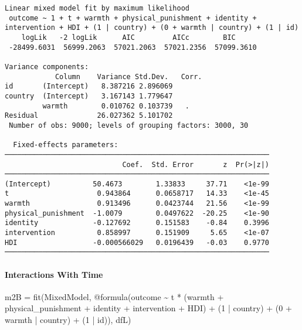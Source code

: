 \documentclass[
  letterpaper,
  DIV=11,
  numbers=noendperiod]{scrreprt}
\let\oldparagraph\paragraph
\renewcommand{\paragraph}[1]{\oldparagraph{#1}\mbox{}}
\newenvironment{Shaded}{\begin{snugshade}}{\end{snugshade}}
\newcommand{\FloatTok}[1]{\textcolor[rgb]{0.68,0.00,0.00}{#1}}
\newcommand{\FunctionTok}[1]{\textcolor[rgb]{0.28,0.35,0.67}{#1}}
\newcommand{\NormalTok}[1]{\textcolor[rgb]{0.00,0.23,0.31}{#1}}
\newcommand{\OperatorTok}[1]{\textcolor[rgb]{0.37,0.37,0.37}{#1}}
\newcommand{\PreprocessorTok}[1]{\textcolor[rgb]{0.68,0.00,0.00}{#1}}
\begin{document}
\begin{verbatim}
Linear mixed model fit by maximum likelihood
 outcome ~ 1 + t + warmth + physical_punishment + identity + intervention + HDI + (1 | country) + (0 + warmth | country) + (1 | id)
    logLik   -2 logLik      AIC         AICc        BIC     
 -28499.6031  56999.2063  57021.2063  57021.2356  57099.3610

Variance components:
            Column    Variance Std.Dev.   Corr.
id       (Intercept)   8.387216 2.896069
country  (Intercept)   3.167143 1.779647
         warmth        0.010762 0.103739   .  
Residual              26.027362 5.101702
 Number of obs: 9000; levels of grouping factors: 3000, 30

  Fixed-effects parameters:
───────────────────────────────────────────────────────────────
                            Coef.  Std. Error       z  Pr(>|z|)
───────────────────────────────────────────────────────────────
(Intercept)          50.4673        1.33833     37.71    <1e-99
t                     0.943864      0.0658717   14.33    <1e-45
warmth                0.913496      0.0423744   21.56    <1e-99
physical_punishment  -1.0079        0.0497622  -20.25    <1e-90
identity             -0.127692      0.151583    -0.84    0.3996
intervention          0.858997      0.151909     5.65    <1e-07
HDI                  -0.000566029   0.0196439   -0.03    0.9770
───────────────────────────────────────────────────────────────
\end{verbatim}

\paragraph{Interactions With Time}\label{interactions-with-time-2}

\begin{Shaded}
\begin{Highlighting}[]
\NormalTok{m2B }\OperatorTok{=} \FunctionTok{fit}\NormalTok{(MixedModel, }\PreprocessorTok{@formula}\NormalTok{(outcome }\OperatorTok{\textasciitilde{}}\NormalTok{ t }\OperatorTok{*}\NormalTok{ (warmth }\OperatorTok{+} 
\NormalTok{                                 physical\_punishment }\OperatorTok{+} 
\NormalTok{                                 identity }\OperatorTok{+}\NormalTok{ intervention }\OperatorTok{+} 
\NormalTok{                                   HDI) }\OperatorTok{+}
\NormalTok{                                 (}\FloatTok{1} \OperatorTok{|}\NormalTok{ country) }\OperatorTok{+}
\NormalTok{                                 (}\FloatTok{0} \OperatorTok{+}\NormalTok{ warmth }\OperatorTok{|}\NormalTok{ country) }\OperatorTok{+}
\NormalTok{                                 (}\FloatTok{1} \OperatorTok{|}\NormalTok{ id)), dfL)}
\end{Highlighting}
\end{Shaded}
\end{document}
